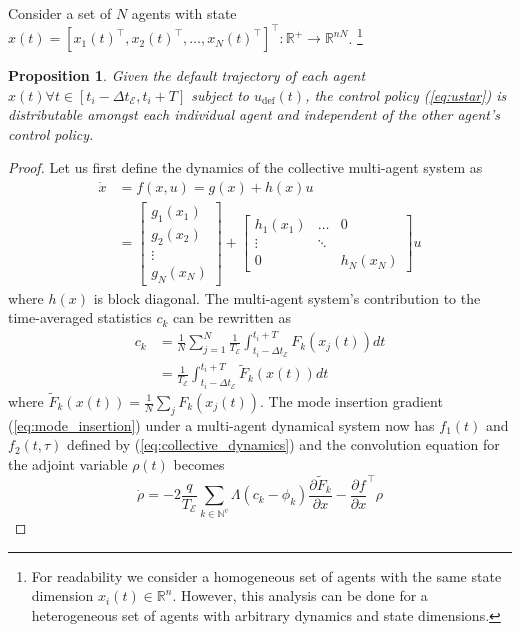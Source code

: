 \documentclass[letterpaper, 10 pt, conference]{ieeeconf}  %
\newtheorem{proposition}{Proposition}
\begin{document}
Consider a set of $N$ agents with state $x(t) = \left[ x_1(t)^\top, x_2(t)^\top, \ldots, x_N(t)^\top\right]^\top : \mathbb{R}^+ \to \mathbb{R}^{n N}$. \footnote{For readability we consider a homogeneous set of agents with the same state dimension $x_i(t) \in \mathbb{R}^n$. However, this analysis can be done for a heterogeneous set of agents with arbitrary dynamics and state dimensions.}
\begin{proposition}
Given the default trajectory of each agent $x(t) \forall t \in \left[ t_i - \Delta t_\mathcal{E}, t_i + T\right]$ subject to $u_\text{def}(t)$, the control policy (\ref{eq:ustar}) is {\it distributable} amongst each individual agent and independent of the other agent's control policy.
\end{proposition}
\begin{proof}
Let us first define the dynamics of the collective multi-agent system as
\begin{align} \label{eq:collective_dynamics}
\dot{x} & = f(x,u) = g(x) + h(x) u \nonumber\\
& = \begin{bmatrix}
g_1(x_1) \\
g_2(x_2) \\
\vdots \\
g_N(x_N)
\end{bmatrix} + 
 \begin{bmatrix}
h_1(x_1) & \ldots & 0\\
\vdots& \ddots & \\
0 & & h_N(x_N)
\end{bmatrix} u
\end{align}
where $h(x)$ is block diagonal.
The multi-agent system's contribution to the time-averaged statistics $c_k$ can be rewritten as
\begin{align}\label{eq:centralized_ck}
c_k & = \frac{1}{N} \sum_{j=1}^N \frac{1}{T_\mathcal{E}} \int_{t_i -\Delta t_\mathcal{E}}^{t_i + T} F_k(x_j(t)) dt \nonumber \\
& = \frac{1}{T_\mathcal{E}} \int_{t_i - \Delta t_\mathcal{E}}^{t_i+T} \tilde{F}_k(x(t)) dt
\end{align}
where $\tilde{F}_k(x(t)) = \frac{1}{N}\sum_j F_k(x_j(t))$.
The mode insertion gradient (\ref{eq:mode_insertion}) under a multi-agent dynamical system now has $f_1(t)$ and $f_2(t, \tau)$ defined by (\ref{eq:collective_dynamics}) and the convolution equation for the adjoint variable $\rho(t)$ becomes
\begin{equation}\label{eq:decentralized_adjoint}
\dot{\rho} = -2 \frac{q}{T_\mathcal{E}}\sum_{k \in \mathbb{N}^v} \Lambda \left( c_k - \phi_k \right) \frac{\partial \tilde{F}_k}{\partial x} - \frac{\partial f}{\partial x}^\top \rho

\end{equation}
\end{proof}
\end{document}
